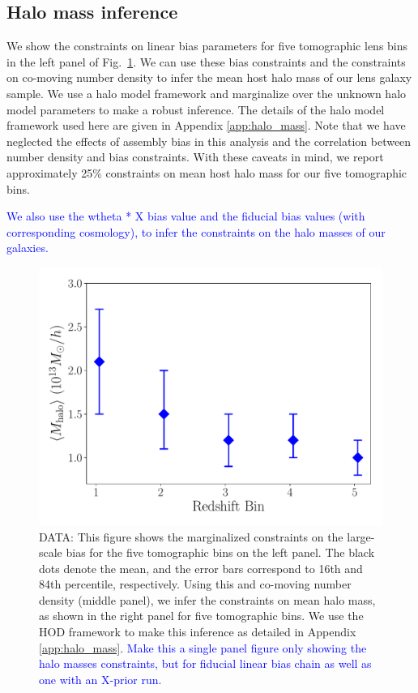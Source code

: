 \documentclass[fleqn,usenatbib]{mnras}
\newcommand{\blue}[1]{\textcolor{blue}{#1}}
\begin{document}
\subsection{Halo mass inference}

We show the constraints on linear bias parameters for five tomographic lens bins in the left panel of Fig.~\ref{fig:bias_mass_nbar}. We can use these bias constraints and the constraints on co-moving number density to infer the mean host halo mass of our lens galaxy sample. We use a halo model framework and marginalize over the unknown halo model parameters to make a robust inference. The details of the halo model framework used here are given in Appendix \ref{app:halo_mass}. Note that we have neglected the effects of assembly bias in this analysis and the correlation between number density and bias constraints. With these caveats in mind, we report approximately 25\% constraints on mean host halo mass for our five tomographic bins.

\blue{We also use the wtheta * X bias value and the fiducial bias values (with corresponding cosmology), to infer the constraints on the halo masses of our galaxies. }


\begin{figure}
\includegraphics[width=\columnwidth]{figs/M_const.pdf}
\caption[]{DATA: This figure shows the marginalized constraints on the large-scale bias for the five tomographic bins on the left panel. The black dots denote the mean, and the error bars correspond to 16th and 84th percentile, respectively. Using this and co-moving number density (middle panel), we infer the constraints on mean halo mass, as shown in the right panel for five tomographic bins. We use the HOD framework to make this inference as detailed in Appendix \ref{app:halo_mass}. \blue{Make this a single panel figure only showing the halo masses constraints, but for fiducial linear bias chain as well as one with an X-prior run. }
}
\label{fig:bias_mass_nbar}
\end{figure}
\end{document}
